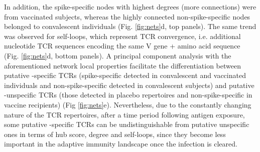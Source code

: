 In addition, the spike-specific nodes with highest degrees (more connections) were from vaccinated subjects, whereas the highly connected non-spike-specific nodes belonged to convalescent individuals (Fig. \ref{fig:nets}d, top panels). The same trend was observed for self-loops, which represent TCR convergence, i.e. additional nucleotide TCR sequences encoding the same V gene + amino acid sequence (Fig. \ref{fig:nets}d, bottom panels). A principal component analysis with the aforementioned network local properties facilitate the differentiation between putative \covid-specific TCRs (spike-specific detected in convalescent and vaccinated individuals and non-spike-specific detected in convalescent subjects) and putative \covid-unspecific TCRs (those detected in placebo repertoires and non-spike-specific in vaccine recipients) (Fig \ref{fig:nets}e). Nevertheless, due to the constantly changing nature of the TCR repertoires, after a time period following antigen exposure, some putative \covid-specific TCRs can be undistinguishable from putative unspecific ones in terms of hub score, degree and self-loops, since they become less important in the adaptive immunity landscape once the infection is cleared.



